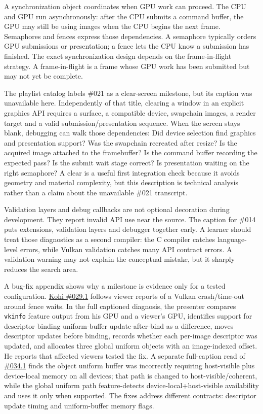A synchronization object coordinates when GPU work can proceed. The CPU and GPU run asynchronously: after the CPU submits a command buffer, the GPU may still be using images when the CPU begins the next frame. Semaphores and fences express those dependencies. A semaphore typically orders GPU submissions or presentation; a fence lets the CPU know a submission has finished. The exact synchronization design depends on the frame-in-flight strategy. A frame-in-flight is a frame whose GPU work has been submitted but may not yet be complete.

The playlist catalog labels \#021 as a clear-screen milestone, but its caption was unavailable here. Independently of that title, clearing a window in an explicit graphics API requires a surface, a compatible device, swapchain images, a render target and a valid submission/presentation sequence. When the screen stays blank, debugging can walk those dependencies: Did device selection find graphics and presentation support? Was the swapchain recreated after resize? Is the acquired image attached to the framebuffer? Is the command buffer recording the expected pass? Is the submit wait stage correct? Is presentation waiting on the right semaphore? A clear is a useful first integration check because it avoids geometry and material complexity, but this description is technical analysis rather than a claim about the unavailable \#021 transcript.

Validation layers and debug callbacks are not optional decoration during development. They report invalid API use near the source. The caption for \#014 puts extensions, validation layers and debugger together early. A learner should treat those diagnostics as a second compiler: the C compiler catches language-level errors, while Vulkan validation catches many API contract errors. A validation warning may not explain the conceptual mistake, but it sharply reduces the search area.

A bug-fix appendix shows why a milestone is evidence only for a tested configuration. \href{https://www.youtube.com/watch?v=U4QvUeUL37Y}{Kohi \#029.1} follows viewer reports of a Vulkan crash/time-out around fence waits. In the full captioned diagnosis, the presenter compares \texttt{vkinfo} feature output from his GPU and a viewer's GPU, identifies support for descriptor binding uniform-buffer update-after-bind as a difference, moves descriptor updates before binding, records whether each per-image descriptor was updated, and allocates three global uniform objects with an image-indexed offset. He reports that affected viewers tested the fix. A separate full-caption read of \href{https://www.youtube.com/watch?v=aD6fZ7tQSAY}{\#034.1} finds the object uniform buffer was incorrectly requiring host-visible plus device-local memory on all devices; that path is changed to host-visible/coherent, while the global uniform path feature-detects device-local+host-visible availability and uses it only when supported. The fixes address different contracts: descriptor update timing and uniform-buffer memory flags.

